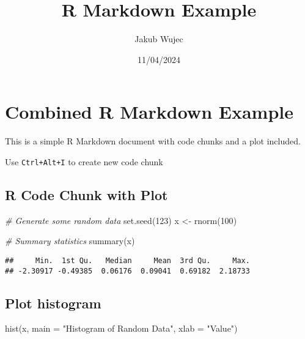 \documentclass[
]{article}
\title{R Markdown Example}
\author{Jakub Wujec}
\date{11/04/2024}
\newenvironment{Shaded}{\begin{snugshade}}{\end{snugshade}}
\newcommand{\AttributeTok}[1]{\textcolor[rgb]{0.77,0.63,0.00}{#1}}
\newcommand{\CommentTok}[1]{\textcolor[rgb]{0.56,0.35,0.01}{\textit{#1}}}
\newcommand{\DecValTok}[1]{\textcolor[rgb]{0.00,0.00,0.81}{#1}}
\newcommand{\FunctionTok}[1]{\textcolor[rgb]{0.00,0.00,0.00}{#1}}
\newcommand{\NormalTok}[1]{#1}
\newcommand{\OtherTok}[1]{\textcolor[rgb]{0.56,0.35,0.01}{#1}}
\newcommand{\StringTok}[1]{\textcolor[rgb]{0.31,0.60,0.02}{#1}}
\begin{document}
\maketitle

\hypertarget{combined-r-markdown-example}{%
\section{Combined R Markdown
Example}\label{combined-r-markdown-example}}

This is a simple R Markdown document with code chunks and a plot
included.

Use \texttt{Ctrl+Alt+I} to create new code chunk

\hypertarget{r-code-chunk-with-plot}{%
\subsection{R Code Chunk with Plot}\label{r-code-chunk-with-plot}}

\begin{Shaded}
\begin{Highlighting}[]
\CommentTok{\# Generate some random data}
\FunctionTok{set.seed}\NormalTok{(}\DecValTok{123}\NormalTok{)}
\NormalTok{x }\OtherTok{\textless{}{-}} \FunctionTok{rnorm}\NormalTok{(}\DecValTok{100}\NormalTok{)}

\CommentTok{\# Summary statistics}
\FunctionTok{summary}\NormalTok{(x)}
\end{Highlighting}
\end{Shaded}

\begin{verbatim}
##     Min.  1st Qu.   Median     Mean  3rd Qu.     Max. 
## -2.30917 -0.49385  0.06176  0.09041  0.69182  2.18733
\end{verbatim}

\hypertarget{plot-histogram}{%
\subsection{Plot histogram}\label{plot-histogram}}

\begin{Shaded}
\begin{Highlighting}[]
\FunctionTok{hist}\NormalTok{(x, }\AttributeTok{main =} \StringTok{"Histogram of Random Data"}\NormalTok{, }\AttributeTok{xlab =} \StringTok{"Value"}\NormalTok{)}
\end{Highlighting}
\end{Shaded}
\end{document}

